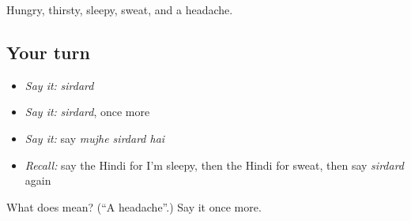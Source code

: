 \begin{grammarlens}[title={What you've built}]
Hungry, thirsty, sleepy, sweat, and a headache.
\end{grammarlens}

\subsection*{Your turn}
\begin{itemize}
\raggedright
  \item \emph{Say it:} \emph{sirdard}
  \item \emph{Say it:} \emph{sirdard}, once more
  \item \emph{Say it:} say \emph{mujhe sirdard hai}
  \item \emph{Recall:} say the Hindi for I'm sleepy, then the Hindi for sweat, then say \emph{sirdard} again
\end{itemize}

\begin{tcolorbox}[breakable,colback=teal!4,colframe=teal!35!black,title={Before you move on}]
What does  mean? (\textquotedblleft{}A headache\textquotedblright{}.) Say it once more.
\end{tcolorbox}
